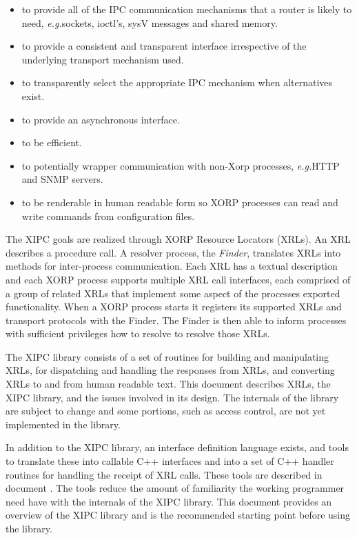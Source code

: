 \documentclass[11pt]{article}
\newcommand{\eg}{\emph{e.g.\/}} %
\begin{document}
\begin{itemize}

\item to provide all of the IPC communication mechanisms that a router is
likely to need, \eg sockets, ioctl's, sysV messages and shared memory.

\item to provide a consistent and transparent interface irrespective
of the underlying transport mechanism used.

\item to transparently select the appropriate IPC mechanism when
alternatives exist.

\item to provide an asynchronous interface.

\item to be efficient.

\item to potentially wrapper communication with non-Xorp processes,
\eg HTTP and SNMP servers.

\item to be renderable in human readable form so XORP processes can
read and write commands from configuration files.

\end{itemize}

The XIPC goals are realized through XORP Resource Locators (XRLs).  An
XRL describes a procedure call.  A resolver process, the
\emph{Finder}, translates XRLs into methods for inter-process
communication.  Each XRL has a textual description and each XORP
process supports multiple XRL call interfaces, each comprised of a
group of related XRLs that implement some aspect of the processes
exported functionality.  When a XORP process starts it registers its
supported XRLs and transport protocols with the Finder.  The Finder is
then able to inform processes with sufficient privileges how to
resolve to resolve those XRLs.

The XIPC library consists of a set of routines for building and
manipulating XRLs, for dispatching and handling the responses from
XRLs, and converting XRLs to and from human readable text.  This
document describes XRLs, the XIPC library, and the issues involved in
its design.  The internals of the library are subject to change and
some portions, such as access control, are not yet implemented in the
library.

In addition to the XIPC library, an interface definition language
exists, and tools to translate these into callable C++ interfaces and
into a set of C++ handler routines for handling the receipt of XRL
calls.  These tools are described in document \cite{xorp:xrl_interfaces}.
The tools reduce 
the amount of familiarity the working programmer need have with the
internals of the XIPC library.  This document provides an overview of
the XIPC library and is the recommended starting point before using
the library.
\end{document}
